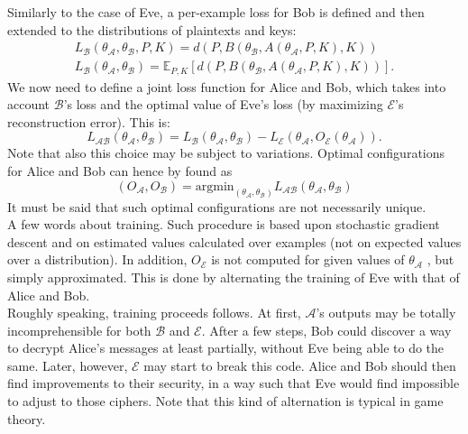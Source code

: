 \documentclass[%
    corpo=11pt,
    twoside,
    stile=classica,
    oldstyle,
    autoretitolo,
    tipotesi=magistrale,
    greek,
    evenboxes,
    english
]{toptesi}
\begin{document}
Similarly to the case of Eve, a per-example loss for Bob is defined and then extended to the distributions of plaintexts and keys:
\begin{align}
L_{\mathcal{B}}\left(\theta_{\mathcal{A}}, \theta_{\mathcal{B}}, P, K \right) = d\left(P, B(\theta_{\mathcal{B}}, A(\theta_{\mathcal{A}}, P, K), K ) \right) \nonumber \\ 
L_{\mathcal{B}}\left(\theta_{\mathcal{A}}, \theta_{\mathcal{B}}\right) = \mathbb{E}_{P,K}\left[ d\left(P, B(\theta_{\mathcal{B}}, A(\theta_{\mathcal{A}}, P, K), K ) \right)\right].
\end{align}
We now need to define a joint loss function for Alice and Bob, which takes into account $\mathcal{B}$'s loss and the optimal value of Eve's loss (by maximizing $\mathcal{E}$'s reconstruction error). This is: 
\begin{equation}
L_{\mathcal{A}\mathcal{B}}(\theta_{\mathcal{A}}, \theta_{\mathcal{B}}) = L_{\mathcal{B}}\left(\theta_{\mathcal{A}}, \theta_{\mathcal{B}}\right) - L_{\mathcal{E}}(\theta_{\mathcal{A}}, O_{\mathcal{E}}\left(\theta_{\mathcal{A}} \right)).
\end{equation}
Note that also this choice may be subject to variations. Optimal configurations for Alice and Bob can hence by found as 
\begin{equation}
(O_{\mathcal{A}}, O_{\mathcal{B}}) = \textrm{argmin}_{(\theta_{\mathcal{A}}, \theta_{\mathcal{B}})}L_{\mathcal{A}\mathcal{B}}(\theta_{\mathcal{A}}, \theta_{\mathcal{B}}) 
\end{equation}
It must be said that such optimal configurations are not necessarily unique. \\
A few words about training. Such procedure is based upon stochastic gradient descent and on estimated values calculated over examples (not on expected values over a distribution). In addition, $O_{\mathcal{E}}$ is not computed for given values of $\theta_{\mathcal{A}}$ , but simply approximated. This is done by alternating the training of Eve with that of Alice and Bob. \\
Roughly speaking, training proceeds follows. At first, $\mathcal{A}$'s outputs may be totally incomprehensible for both $\mathcal{B}$ and $\mathcal{E}$. After a few steps, Bob could discover a way to decrypt Alice's messages at least partially, without Eve being able to do the same. Later, however, $\mathcal{E}$ may start to break this code. Alice and Bob should then find improvements to their security, in a way such that Eve would find impossible to adjust to those ciphers. Note that this kind of alternation is typical in game theory. 
\end{document}
